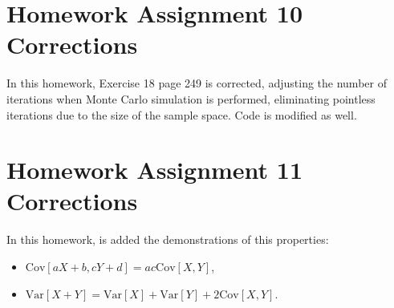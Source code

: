 \documentclass[10pt,leter,openany]{article}
\begin{document}
	
	
		
		
\section*{Homework Assignment 10 Corrections}
	In this homework, Exercise 18 page 249 is corrected, adjusting the number of iterations when  Monte Carlo simulation is performed, eliminating pointless iterations due to the size of the sample space. Code is modified as well.
	
	
	
\section*{Homework Assignment 11 Corrections}

	In this homework, is added the demonstrations of this properties:
	\begin{itemize}
		\item $\mbox{Cov}[aX+b, cY+d] = ac\mbox{Cov}[X,Y]$,
		\item $\mbox{Var}[X+Y] = \mbox{Var}[X] + \mbox{Var}[Y] + 2\mbox{Cov}[X,Y]$.
	\end{itemize}












	
\end{document}
